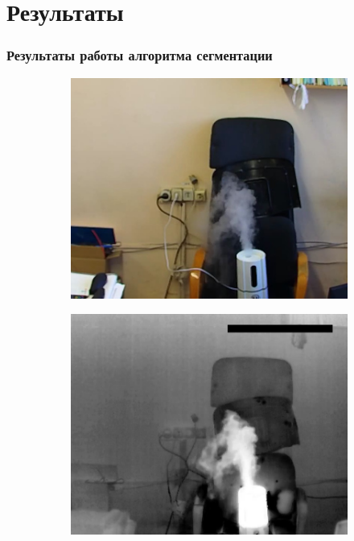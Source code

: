 \documentclass[t]{beamer}
\begin{document}
\section{Результаты}

	\begin{frame}
		\frametitle{Результаты работы алгоритма сегментации}
		\vspace*{-0.35cm}
		\begin{figure}[h!]
			\begin{subfigure}{.30\textwidth}
				\centering
				\includegraphics[width = \textwidth]{image/examples/img/206}
			\end{subfigure}
			\begin{subfigure}{.30\textwidth}
				\centering
				\includegraphics[width = \textwidth]{image/examples/tep/206}

\end{subfigure}
\end{figure}
\end{frame}
\end{document}
